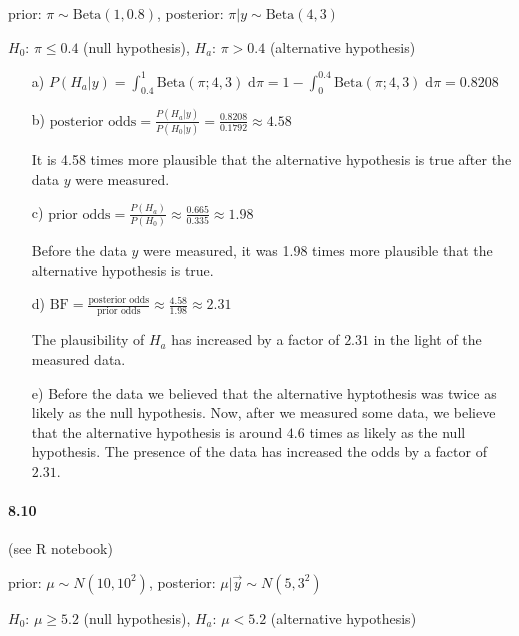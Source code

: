 \documentclass[fontsize=11pt,DIV=18,parskip=half]{scrartcl}
\begin{document}
prior: $\pi \sim \text{Beta}(1,0.8)$, posterior: $\pi|y \sim \text{Beta}(4,3)$

$H_0$: $\pi\leq0.4$ (null hypothesis), $H_a$: $\pi>0.4$ (alternative hypothesis)

\begin{enumerate}
\item[a)] $P(H_a|y) = \int_{0.4}^1 \text{Beta}(\pi; 4, 3) \; \text{d}\pi = 1 - \int_{0}^{0.4} \text{Beta}(\pi; 4, 3) \; \text{d}\pi = 0.8208$
\item[b)] $\text{posterior odds} = \displaystyle{\frac{P(H_a|y)}{P(H_0|y)} = \frac{0.8208}{0.1792}} \approx 4.58$

It is 4.58 times more plausible that the alternative hypothesis is true after the data $y$ were measured.
\item[c)] $\text{prior odds} = \displaystyle{\frac{P(H_a)}{P(H_0)} \approx \frac{0.665}{0.335}} \approx 1.98$

Before the data $y$ were measured, it was 1.98 times more plausible that the alternative hypothesis is true.
\item[d)] $\text{BF} = \displaystyle{\frac{\text{posterior odds}}{\text{prior odds}} \approx \frac{4.58}{1.98}} \approx 2.31$

The plausibility of $H_a$ has increased by a factor of $2.31$ in the light of the measured data.

\item[e)] Before the data we believed that the alternative hyptothesis was twice as likely as the null hypothesis. Now, after we measured some data, we believe that the alternative hypothesis is around $4.6$ times as likely as the null hypothesis. The presence of the data has increased the odds by a factor of $2.31$.
\end{enumerate}

\paragraph{8.10} (see R notebook)

prior: $\mu \sim N(10,10^2)$, posterior: $\mu|\vec{y} \sim N(5,3^2)$

$H_0$: $\mu\geq5.2$ (null hypothesis), $H_a$: $\mu<5.2$ (alternative hypothesis)
\end{document}
